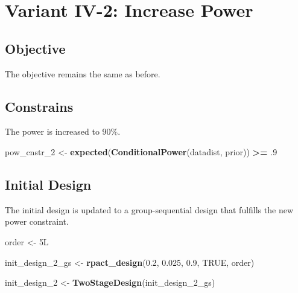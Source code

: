 \documentclass[]{book}
\newenvironment{Shaded}{\begin{snugshade}}{\end{snugshade}}
\newcommand{\DecValTok}[1]{\textcolor[rgb]{0.00,0.00,0.81}{#1}}
\newcommand{\FloatTok}[1]{\textcolor[rgb]{0.00,0.00,0.81}{#1}}
\newcommand{\KeywordTok}[1]{\textcolor[rgb]{0.13,0.29,0.53}{\textbf{#1}}}
\newcommand{\NormalTok}[1]{#1}
\newcommand{\OperatorTok}[1]{\textcolor[rgb]{0.81,0.36,0.00}{\textbf{#1}}}
\newcommand{\OtherTok}[1]{\textcolor[rgb]{0.56,0.35,0.01}{#1}}
\newcommand{\StringTok}[1]{\textcolor[rgb]{0.31,0.60,0.02}{#1}}
\begin{document}
\hypertarget{variantIV_2}{%
\section{Variant IV-2: Increase Power}\label{variantIV_2}}

\hypertarget{objective-8}{%
\subsection{Objective}\label{objective-8}}

The objective remains the same as before.

\hypertarget{constrains-8}{%
\subsection{Constrains}\label{constrains-8}}

The power is increased to \(90\%\).

\begin{Shaded}
\begin{Highlighting}[]
\NormalTok{pow_cnstr_}\DecValTok{2}\NormalTok{ <-}\StringTok{ }\KeywordTok{expected}\NormalTok{(}\KeywordTok{ConditionalPower}\NormalTok{(datadist, prior)) }\OperatorTok{>=}\StringTok{ }\FloatTok{.9}
\end{Highlighting}
\end{Shaded}

\hypertarget{initial-design-7}{%
\subsection{Initial Design}\label{initial-design-7}}

The initial design is updated to a group-sequential design that fulfills
the new power constraint.

\begin{Shaded}
\begin{Highlighting}[]
\NormalTok{order <-}\StringTok{ }\NormalTok{5L }

\NormalTok{init_design_}\DecValTok{2}\NormalTok{_gs <-}\StringTok{ }\KeywordTok{rpact_design}\NormalTok{(}\FloatTok{0.2}\NormalTok{, }\FloatTok{0.025}\NormalTok{, }\FloatTok{0.9}\NormalTok{, }\OtherTok{TRUE}\NormalTok{, order)}

\NormalTok{init_design_}\DecValTok{2}\NormalTok{    <-}\StringTok{ }\KeywordTok{TwoStageDesign}\NormalTok{(init_design_}\DecValTok{2}\NormalTok{_gs)}
\end{Highlighting}
\end{Shaded}
\end{document}

